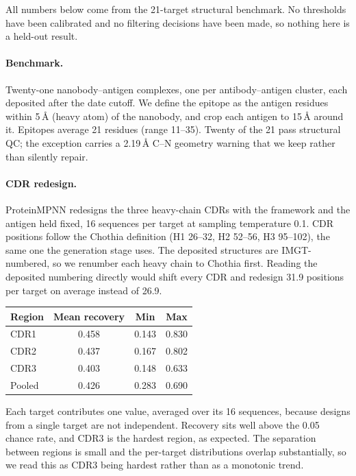 \documentclass[11pt, logo, nonumbering]{preprint}
\begin{document}
All numbers below come from the 21-target structural benchmark. No thresholds
have been calibrated and no filtering decisions have been made, so nothing here
is a held-out result.

\paragraph{Benchmark.} Twenty-one nanobody--antigen complexes, one per
antibody--antigen cluster, each deposited after the date cutoff. We define the
epitope as the antigen residues within 5\,\AA{} (heavy atom) of the nanobody,
and crop each antigen to 15\,\AA{} around it. Epitopes average 21 residues
(range 11--35). Twenty of the 21 pass structural QC; the exception carries a
2.19\,\AA{} C--N geometry warning that we keep rather than silently repair.

\paragraph{CDR redesign.} ProteinMPNN redesigns the three heavy-chain CDRs with
the framework and the antigen held fixed, 16 sequences per target at sampling
temperature 0.1. CDR positions follow the Chothia definition (H1 26--32,
H2 52--56, H3 95--102), the same one the generation stage uses. The deposited
structures are IMGT-numbered, so we renumber each heavy chain to Chothia first.
Reading the deposited numbering directly would shift every CDR and redesign
31.9 positions per target on average instead of 26.9.

\begin{center}
\small
\begin{tabular}{@{}l c c c@{}}
\toprule
\textbf{Region} & \textbf{Mean recovery} & \textbf{Min} & \textbf{Max} \\
\midrule
CDR1   & 0.458 & 0.143 & 0.830 \\
CDR2   & 0.437 & 0.167 & 0.802 \\
CDR3   & 0.403 & 0.148 & 0.633 \\
\addlinespace
Pooled & 0.426 & 0.283 & 0.690 \\
\bottomrule
\end{tabular}
\end{center}

\noindent Each target contributes one value, averaged over its 16 sequences,
because designs from a single target are not independent. Recovery sits well
above the 0.05 chance rate, and CDR3 is the hardest region, as expected. The
separation between regions is small and the per-target distributions overlap
substantially, so we read this as CDR3 being hardest rather than as a
monotonic trend.
\end{document}

